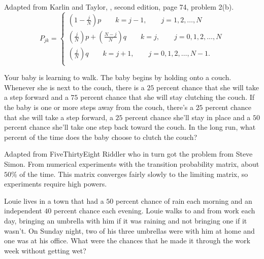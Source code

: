 \documentclass[12pt]{article}
\begin{document}
\begin{solution}
    Adapted from Karlin and Taylor, , second edition, page 74, problem 2(b).
    \[
        P_{jk} =
        \begin{cases}
            \left( 1-\frac{j}{N}\right)p \qquad k = j-1, \qquad j=1,2,\dots,N
            \\
            \left( \frac{j}{N} \right) p + \left( \frac{N-j}{N} \right)
            q \qquad k = j, \qquad j=0,1,2,\dots,N \\
            \left( \frac{j}{N} \right) q \qquad k = j+1, \qquad j=0,1,2,\dots,N-1.
            \\
        \end{cases}
    \]
\end{solution}
\begin{exercise}
    Your baby is learning to walk.  The baby begins by holding onto a
    couch.  Whenever she is next to the couch, there is a \( 25 \)
    percent chance that she will take a step forward and a \( 75 \)
    percent chance that she will stay clutching the couch.  If the baby
    is one or more steps away from the couch, there’s a \( 25 \)
    percent chance that she will take a step forward, a \( 25 \) percent
    chance she’ll stay in place and a \( 50 \) percent chance she’ll
    take one step back toward the couch.  In the long run, what percent
    of the time does the baby choose to clutch the couch?
\end{exercise}
\begin{solution}
    Adapted from 
    {FiveThirtyEight Riddler} who in turn got the problem from Steve
    Simon. From numerical experiments with the transition probability
    matrix, about \( 50\% \) of the time.  This matrix converges fairly
    slowly to the limiting matrix, so experiments require high powers.
\end{solution}
\begin{exercise}
    Louie lives in a town that had a \( 50 \) percent chance of rain
    each morning and an independent \( 40 \) percent chance each
    evening.  Louie walks to and from work each day, bringing an
    umbrella with him if it was raining and not bringing one if it
    wasn't.  On Sunday night, two of his three umbrellas were with him
    at home and one was at his office.  What were the chances that he
    made it through the work week without getting wet?
\end{exercise}
\end{document}
